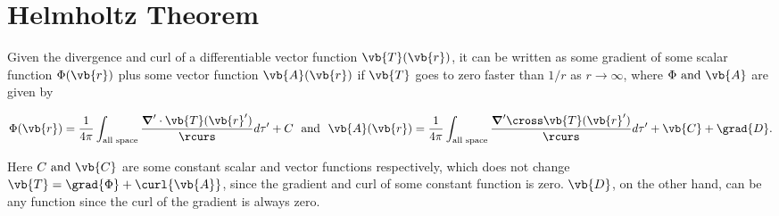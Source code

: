 \documentclass[english,a4paper,12pt]{report}
\begin{document}
	
\section{Helmholtz Theorem}

\begin{theorem}
Given the divergence and curl of a differentiable vector function \(\vb{T}(\vb{r} ) \), it can be written as some gradient of some scalar function \(\Phi(\vb{r} ) \) plus some vector function \(\vb{A}(\vb{r} ) \) if \(\vb{T} \) goes to zero faster than \(1 /r \) as \(r \to \infty\), where \(\Phi \text { and } \vb{A} \) are given by

\begin{equation}
	\Phi(\vb{r} ) = \frac{1}{4\pi } \int_{\text{all space} } \frac{\boldsymbol{\nabla}' \cdot \vb{T} (\vb{r} ')}{\rcurs } d\tau ' + C~\text { and }~ \vb{A} (\vb{r} ) = \frac{1}{4\pi } \int_{\text{all space} } \frac{\boldsymbol{\nabla}' \cross \vb{T} (\vb{r} ')}{\rcurs } d\tau ' + \vb{C} + \grad{D} .
\end{equation}

Here \(C \text { and }  \vb{C} \) are some constant scalar and vector functions respectively, which does not change \(\vb{T} = \grad{\Phi } + \curl{\vb{A} }\), since the gradient and curl of some constant function is zero. \(\vb{D}\), on the other hand, can be any function since the curl of the gradient is always zero. 

\end{theorem}
\end{document}

